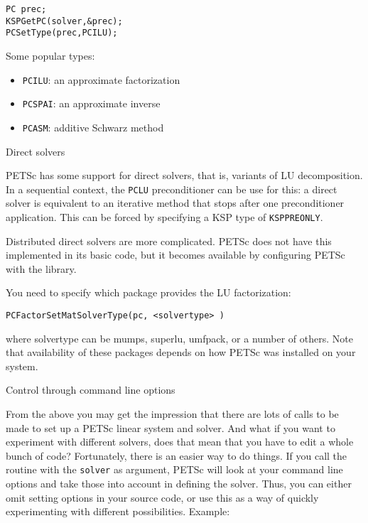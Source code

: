 \begin{lstlisting}
PC prec;
KSPGetPC(solver,&prec);
PCSetType(prec,PCILU);
\end{lstlisting}

Some popular types:
\begin{itemize}
\item \lstinline{PCILU}: an approximate factorization
\item \lstinline{PCSPAI}: an approximate inverse
\item \lstinline{PCASM}: additive Schwarz method
\end{itemize}

 {Direct solvers}

PETSc has some support for direct solvers, that is, variants of LU
decomposition. In a sequential context, the \lstinline{PCLU}
preconditioner can be use for this: a direct solver is equivalent to
an iterative method that stops after one preconditioner
application. This can be forced by specifying a KSP type of
\lstinline{KSPPREONLY}.

Distributed direct solvers are more complicated. PETSc does not have
this implemented in its basic code, but it becomes available by
configuring PETSc with the
 library.

You need to specify which package provides the LU factorization:

\begin{lstlisting}
PCFactorSetMatSolverType(pc, <solvertype> )
\end{lstlisting}

where solvertype can be mumps, superlu, umfpack, or a number of
others. Note that availability of these packages depends on how PETSc
was installed on your system.

 {Control through command line options}

From the above you may get the impression that there are lots of calls
to be made to set up a PETSc linear system and solver. And what if you
want to experiment with different solvers, does that mean that you
have to edit a whole bunch of code? Fortunately, there is an easier
way to do things. If you call the routine
%
with the \lstinline{solver} as argument,
%
PETSc will look at your command line options and take those into
account in defining the solver. Thus, you can either omit setting
options in your source code, or use this as a way of quickly
experimenting with different possibilities. Example:

